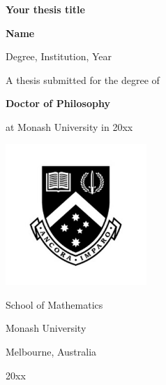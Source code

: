 \begin{titlepage}
  \begin{center}
    \vspace*{\fill}

\begin{center}
    { %
      \textbf{
        \Large Your thesis title
              } 
    }
\end{center}
    
    \vspace{2cm}
    
    {
      \Large
      \textbf{Name}
    }

    \vspace{0.3cm}
    
    {
      \normalsize
      Degree, Institution, Year
      
    }
    
    \vspace{3cm}

    {
      \large
      A thesis submitted for the degree of

      \vspace{0.25cm}
      
      \textbf{Doctor of Philosophy}

      \vspace{0.25cm}
      
      at Monash University in 20xx
    }
    
    \vspace{2.5cm}

    {
      \includegraphics[width=0.4\textwidth]{monash-logo}
    }

    {
      School of Mathematics
      
      Monash University
      
      Melbourne, Australia
      
      20xx
    }
    
    \vspace*{\fill}
  \end{center}
\end{titlepage}

\clearpage
